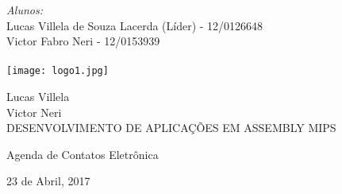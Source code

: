 \documentclass[12pt]{article}
\begin{document}
\begin{titlepage}
\flushleft \Large \emph{Alunos:}\\ 
Lucas Villela de Souza Lacerda (Líder) - 12/0126648\\ 
Victor Fabro Neri - 12/0153939 \\ %


\\[2cm] %


\texttt{[image: logo1.jpg]}\\[1cm] %
 

\begin{titlepage}
\vfill
\begin{center} 
{\large Lucas Villela \\  [0.1cm]
Victor Neri } \\[5cm] 
{\Huge DESENVOLVIMENTO DE APLICAÇÕES EM ASSEMBLY MIPS}\\[1cm]
\hspace{.45\textwidth} %
\begin{minipage}{.5\textwidth}
Agenda de Contatos Eletrônica
\end{minipage}
\vfill
23 de Abril, 2017
\end{center}
\end{titlepage}

\vfill %

\end{titlepage}
\end{document}
